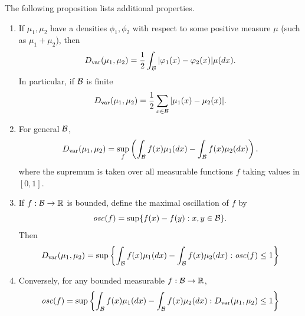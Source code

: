 The following proposition lists additional properties.
\begin{proposition}
\label{prop:var.dist}
\begin{enumerate}[label=(\roman*)]
\item If $\mu_1, \mu_2$ have a densities $\phi_1, \phi_2$ with respect to some positive measure $\mu$ (such as $\mu_1+\mu_2$), then
\[
D_{\mathrm{var}}(\mu_1,\mu_2)  = \frac12 \int_{{\mathcal B}} |\varphi_1(x) - \varphi_2(x)|\mu(dx).
\]
In particular, if ${\mathcal B}$ is finite
\[
D_{\mathrm{var}}(\mu_1,\mu_2)  = \frac12 \sum_{x\in {\mathcal B}} |\mu_1(x) - \mu_2(x)|.
\]


\item For general ${\mathcal B}$,
\begin{equation}
\label{eq:total.var.2}
D_{\mathrm{var}}(\mu_1,\mu_2)  = \sup_f\left(\int_{\mathcal B} f(x) \mu_1(dx) - \int_{\mathcal B} f(x) \mu_2(dx)\right).
\end{equation}
where the supremum is taken over all measurable functions $f$ taking values in $[0,1]$.
\item If $f: {\mathcal B} \to {\mathbb{R}}$ is bounded, define the maximal oscillation of $f$ by
\[
\mathit{osc}(f) = \sup\{f(x) - f(y): x, y\in {\mathcal B}\}.
\]
Then 
\[
D_{\mathrm{var}}(\mu_1,\mu_2) = \sup\left\{ \int_{{\mathcal B}} f(x) \mu_1(dx) - \int_{{\mathcal B}} f(x) \mu_2(dx) : \mathit{osc}(f) \leq 1\right\}
\]  

\item Conversely, for any bounded measurable $f: {\mathcal B}\to {\mathbb{R}}$,
\[
\mathit{osc}(f) = \sup\left\{ \int_{{\mathcal B}} f(x) \mu_1(dx) - \int_{{\mathcal B}} f(x) \mu_2(dx) : D_{\mathrm{var}}(\mu_1,\mu_2) \leq 1\right\}
\]
\end{enumerate}
\end{proposition}
